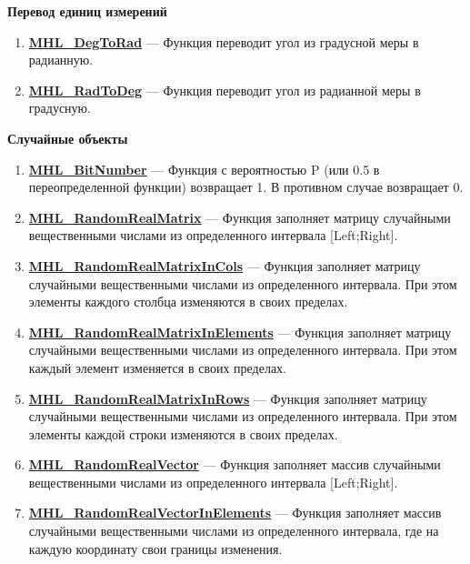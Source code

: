 \documentclass[a4paper,12pt]{article}
\begin{document}
\textbf{Перевод единиц измерений}
\begin{enumerate}

\item \textbf{\hyperref[MHL_DegToRad]{MHL\_DegToRad}} --- Функция переводит угол из градусной меры в радианную.

\item \textbf{\hyperref[MHL_RadToDeg]{MHL\_RadToDeg}} --- Функция переводит угол из радианной меры в градусную.

\end{enumerate}

\textbf{Случайные объекты}
\begin{enumerate}

\item \textbf{\hyperref[MHL_BitNumber]{MHL\_BitNumber}} --- Функция с вероятностью P (или 0.5 в переопределенной функции) возвращает 1. В противном случае возвращает 0.

\item \textbf{\hyperref[MHL_RandomRealMatrix]{MHL\_RandomRealMatrix}} --- Функция заполняет матрицу случайными вещественными числами из определенного интервала [Left;Right].

\item \textbf{\hyperref[MHL_RandomRealMatrixInCols]{MHL\_RandomRealMatrixInCols}} --- Функция заполняет матрицу случайными вещественными числами из определенного интервала. При этом элементы каждого столбца изменяются в своих пределах.

\item \textbf{\hyperref[MHL_RandomRealMatrixInElements]{MHL\_RandomRealMatrixInElements}} --- Функция заполняет матрицу случайными вещественными числами из определенного интервала. При этом каждый элемент изменяется в своих пределах.

\item \textbf{\hyperref[MHL_RandomRealMatrixInRows]{MHL\_RandomRealMatrixInRows}} --- Функция заполняет матрицу случайными вещественными числами из определенного интервала. При этом элементы каждой строки изменяются в своих пределах.

\item \textbf{\hyperref[MHL_RandomRealVector]{MHL\_RandomRealVector}} --- Функция заполняет массив случайными вещественными числами из определенного интервала [Left;Right].

\item \textbf{\hyperref[MHL_RandomRealVectorInElements]{MHL\_RandomRealVectorInElements}} --- Функция заполняет массив случайными вещественными числами из определенного интервала, где на каждую координату свои границы изменения.


\end{enumerate}
\end{document}
